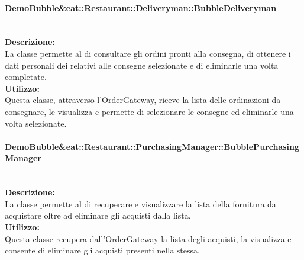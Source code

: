\paragraph{Demo\-Bubble\&eat\-::Restaurant\-::Deliveryman\-::Bubble\-Deliveryman}\label{eat-deliveryman}\mbox{}\\
\textbf{Descrizione:}\\
La classe permette al \Deliveryman{} di consultare gli ordini pronti alla consegna, di ottenere i dati personali dei \Customer[2]{} relativi alle consegne selezionate e di eliminarle una volta completate.\\
\textbf{Utilizzo:}\\
Questa classe, attraverso l'Order\-Gateway, riceve la lista delle ordinazioni da consegnare, le visualizza e permette di selezionare le consegne ed eliminarle una volta selezionate.

\paragraph{Demo\-Bubble\&eat\-::Restaurant\-::PurchasingManager\-::Bubble\-Purcha\-sing\-Ma\-nager}\label{eat-purchasing}\mbox{}\\
\textbf{Descrizione:}\\
La classe permette al \Purchasingmanager{} di recuperare e visualizzare la lista della fornitura da acquistare oltre ad eliminare gli acquisti dalla lista.\\
\textbf{Utilizzo:}\\
Questa classe recupera dall'Order\-Gateway la lista degli acquisti, la visualizza e consente di eliminare gli acquisti presenti nella stessa.

